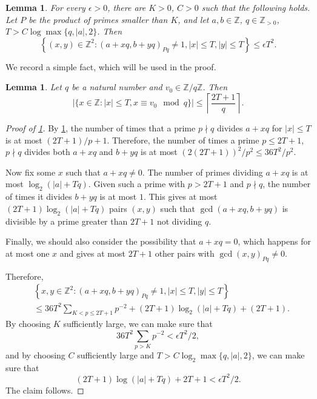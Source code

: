 \documentclass[12pt, a4paper]{amsart}
\numberwithin{equation}{section}
\newtheorem{lemma}[theorem]{Lemma}
\theoremstyle{definition}
\newcommand{\Z}{\mathbb{Z}}
\begin{document}
\begin{lemma}
	\label{lem:disjointness lemma}For every $\epsilon>0$, there are $K>0$,
	$C>0$ such that the following holds.
	Let $P$ be the product of primes smaller than $K$,
	and let $a,b\in\Z$, $q\in\Z_{>0}$, $T>C\log\max\{q,|a|,2\}$.
	Then 
	\[
	\left\{ (x,y)\in\Z^{2}: (a+xq,b+yq)_{Pq}\neq1,\left|x\right|\le T,\left|y\right|\le T\right\} \le\epsilon T^{2}.
	\]
\end{lemma}

We record a simple fact, which will be used in the proof.
\begin{lemma}\label{lem:trivial lemma 2}
	Let $q$ be a natural number and $v_0\in \Z/q\Z$. Then 
	\[
	|\{x\in \Z : |x|\le T, x\equiv v_0 \mod q\}|\le \left\lceil \frac{2T+1}{q}\right\rceil.
	\]
\end{lemma}

\begin{proof}[Proof of \cref{lem:disjointness lemma}]
	By \cref{lem:trivial lemma 2}, the number of times that a prime $p\nmid q$ divides $a+xq$ for $|x|\le T$ is at most $(2T+1)/p+1$. Therefore, the number of times a prime $p\le2T+1$, $p\nmid q$ divides both $a+xq$ and $b+yq$ is at most $(2(2T+1))^2/p^2\le 36 T^{2}/p^{2}$.
	
	Now fix some $x$ such that $a+xq\ne0$.
	The number of primes dividing $a+xq$ is at most $\log_{2}(|a|+Tq)$.
	Given such a prime with $p>2T+1$ and $p\nmid q$, the number of times it divides $b+yq$ is at most $1$. 
	This gives at most $(2T+1)\log_2(|a|+Tq)$ pairs $(x,y)$ such that $\gcd(a+xq,b+yq)$
	is divisible by a prime greater than $2T+1$ not dividing $q$.
	
	Finally, we should also consider the possibility that $a+xq=0$, which happens for at most one $x$ and gives at most $2T+1$ other pairs with $\gcd(x,y)_{Pq}\neq0$.
	
	Therefore, 
	\begin{align*}
		& \left\{ x,y\in\Z^{2}: (a+xq,b+yq)_{Pq}\neq 1,\left|x\right|\le T,\left|y\right|\le T\right\} \\
		& \le36T^{2}\sum_{K<p\le2T+1}p^{-2}+(2T+1)\log_2(|a|+Tq)+(2T+1).
	\end{align*}
	By choosing $K$ sufficiently large, we can make sure that 
	\[
	36T^{2}\sum_{p>K}p^{-2}<\epsilon T^{2}/2,
	\]
	and by choosing $C$ sufficiently large and $T>C\log_2\max\{q,|a|,2\}$, we can make sure that 
	\[
	(2T+1)\log(|a|+Tq)+2T+1<\epsilon T^{2}/2.
	\]
	The claim follows.
\end{proof}
\end{document}
